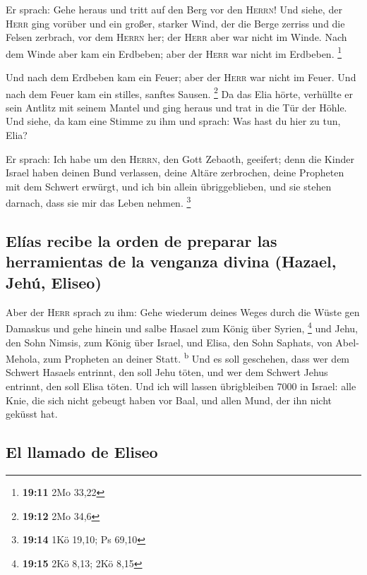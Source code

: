  Er sprach: Gehe heraus und tritt auf den Berg vor den
\textsc{Herrn}! Und siehe, der \textsc{Herr} ging vorüber und ein
großer, starker Wind, der die Berge zerriss und die Felsen zerbrach, vor
dem \textsc{Herrn} her; der \textsc{Herr} aber war nicht im Winde. Nach
dem Winde aber kam ein Erdbeben; aber der \textsc{Herr} war nicht im
Erdbeben. \footnote{\textbf{19:11} 2Mo 33,22}

 Und nach dem Erdbeben kam ein Feuer; aber der
\textsc{Herr} war nicht im Feuer. Und nach dem Feuer kam ein stilles,
sanftes Sausen. \footnote{\textbf{19:12} 2Mo 34,6}  Da
das Elia hörte, verhüllte er sein Antlitz mit seinem Mantel und ging
heraus und trat in die Tür der Höhle. Und siehe, da kam eine Stimme zu
ihm und sprach: Was hast du hier zu tun, Elia?

 Er sprach: Ich habe um den \textsc{Herrn}, den Gott
Zebaoth, geeifert; denn die Kinder Israel haben deinen Bund verlassen,
deine Altäre zerbrochen, deine Propheten mit dem Schwert erwürgt, und
ich bin allein übriggeblieben, und sie stehen darnach, dass sie mir das
Leben nehmen. \footnote{\textbf{19:14} 1Kö 19,10; Ps 69,10}

\hypertarget{eluxedas-recibe-la-orden-de-preparar-las-herramientas-de-la-venganza-divina-hazael-jehuxfa-eliseo}{%
\subsection{Elías recibe la orden de preparar las herramientas de la
venganza divina (Hazael, Jehú,
Eliseo)}\label{eluxedas-recibe-la-orden-de-preparar-las-herramientas-de-la-venganza-divina-hazael-jehuxfa-eliseo}}

 Aber der \textsc{Herr} sprach zu ihm: Gehe wiederum
deines Weges durch die Wüste gen Damaskus und gehe hinein und salbe
Hasael zum König über Syrien, \footnote{\textbf{19:15} 2Kö 8,13; 2Kö
  8,15}  und Jehu, den Sohn Nimsis, zum König über
Israel, und Elisa, den Sohn Saphats, von Abel-Mehola, zum Propheten an
deiner Statt. \textsuperscript{b}  Und es soll geschehen,
dass wer dem Schwert Hasaels entrinnt, den soll Jehu töten, und wer dem
Schwert Jehus entrinnt, den soll Elisa töten.  Und ich
will lassen übrigbleiben 7000 in Israel: alle Knie, die sich nicht
gebeugt haben vor Baal, und allen Mund, der ihn nicht geküsst hat.

\hypertarget{el-llamado-de-eliseo}{%
\subsection{El llamado de Eliseo}\label{el-llamado-de-eliseo}}

